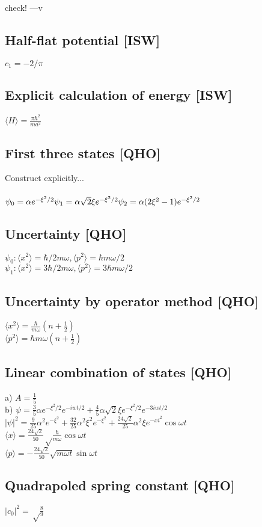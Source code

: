 \documentclass{article}
\newcommand{\half}{\frac{1}{2}}
\newcommand{\<}{\langle}
\renewcommand{\>}{\rangle}
\begin{document}
check! ---v

\subsection{Half-flat potential [ISW]}

$c_1 = -2/\pi$

\subsection{Explicit calculation of energy [ISW]}

$\<H\> = \frac{\pi \hbar^2}{ma^2}$

\subsection{First three states [QHO]}

Construct explicitly...
\\ \\
$\psi_0 = \alpha e^{-\xi^2/2} \\
\psi_1 = \alpha\sqrt 2 \xi e^{-\xi^2/2} \\
\psi_2 = \alpha(2\xi^2 - 1) e^{-\xi^2/2}$

\subsection{Uncertainty [QHO]}

$\psi_0: \<x^2\> = \hbar/2m\omega, \<p^2\> = \hbar m \omega / 2$ \\
$\psi_1: \<x^2\> = 3\hbar/2m\omega, \<p^2\> = 3 \hbar m \omega / 2$

\subsection{Uncertainty by operator method [QHO]}

$\<x^2\> = \frac{\hbar}{m\omega} (n+\half)$ \\
$\<p^2\> = \hbar m \omega (n + \half)$

\subsection{Linear combination of states [QHO]}

a) $A = \frac{1}{5}$ \\
b) $\psi = \frac{3}{5} \alpha e^{-\xi^2/2}e^{-iwt/2} + \frac{4}{5} \alpha \sqrt 2 \xi e^{-\xi^2/2}e^{-3iwt/2}$ \\
$|\psi|^2 = \frac{9}{25} \alpha^2 e^{-\xi^2} + \frac{32}{25} \alpha^2 \xi^2 e^{-\xi^2} + \frac{24\sqrt 2}{25}\alpha^2\xi e^{-xi^2} \cos\omega t$ \\
$\<x\> = \frac{24\sqrt 2}{50} \sqrt\frac{\hbar}{m\omega} \cos\omega t$ \\
$\<p\> = -\frac{24\sqrt 2}{50}\sqrt{m\omega t} \sin\omega t$

\subsection{Quadrapoled spring constant [QHO]}

$|c_0|^2 = \sqrt\frac{8}{9}$
\end{document}
